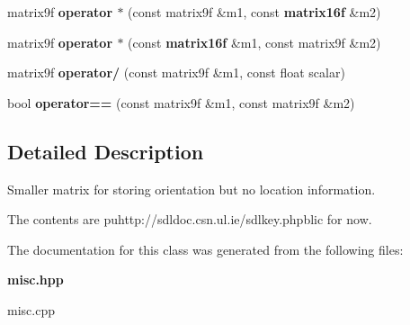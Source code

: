 \begin{CompactItemize}
\item 
{}
matrix9f {\bf operator $\ast$} (const matrix9f \&m1, const {\bf matrix16f} \&m2)\label{classmatrix9f_l7}

\item 
{}
matrix9f {\bf operator $\ast$} (const {\bf matrix16f} \&m1, const matrix9f \&m2)\label{classmatrix9f_l8}

\item 
{}
matrix9f {\bf operator/} (const matrix9f \&m1, const float scalar)\label{classmatrix9f_l9}

\item 
{}
bool {\bf operator==} (const matrix9f \&m1, const matrix9f \&m2)\label{classmatrix9f_l10}

\end{CompactItemize}


\subsection{Detailed Description}
Smaller matrix for storing orientation but no location information.

The contents are puhttp://sdldoc.csn.ul.ie/sdlkey.phpblic for now. 



The documentation for this class was generated from the following files:\begin{CompactItemize}
\item 
{\bf misc.hpp}\item 
misc.cpp\end{CompactItemize}
